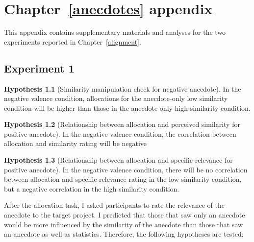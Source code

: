 \documentclass[a4paper, nobind, dvipsnames]{templates/ociamthesis}
\theoremstyle{definition}
\theoremstyle{definition}
\theoremstyle{definition}
\theoremstyle{definition}
\newtheorem{hypothesis}{Hypothesis}[chapter]
\theoremstyle{remark}
\begin{document}
\hypertarget{anecdotes-appendix}{%
\chapter{Chapter~\ref{anecdotes} appendix}\label{anecdotes-appendix}}

\minitoc

This appendix contains supplementary materials and analyses for the two
experiments reported in Chapter~\ref{alignment}.

\hypertarget{anecdotes-1-appendix}{%
\section{Experiment 1}\label{anecdotes-1-appendix}}

\begin{hypothesis}[Similarity manipulation check for negative anecdote]
\protect\hypertarget{hyp:similarity-check-anecdotes-1}{}{\label{hyp:similarity-check-anecdotes-1} {} }In the negative valence condition, allocations for the anecdote-only low
similarity condition will be higher than those in the anecdote-only high
similarity condition.
\end{hypothesis}

\begin{hypothesis}[Relationship between allocation and perceived similarity for positive anecdote]
\protect\hypertarget{hyp:allocation-similarity-anecdotes-1}{}{\label{hyp:allocation-similarity-anecdotes-1} {} }In the negative valence condition, the correlation between allocation and
similarity rating will be negative
\end{hypothesis}

\begin{hypothesis}[Relationship between allocation and specific-relevance for positive anecdote]
\protect\hypertarget{hyp:allocation-specific-relevance-anecdotes-1}{}{\label{hyp:allocation-specific-relevance-anecdotes-1} {} }In the negative valence condition, there will be no correlation between
allocation and specific-relevance rating in the low similarity condition, but a
negative correlation in the high similarity condition.
\end{hypothesis}

After the allocation task, I asked participants to rate the relevance of the
anecdote to the target project. I predicted that those that saw only an
anecdote would be more influenced by the similarity of the anecdote than those
that saw an anecdote as well as statistics. Therefore, the following hypotheses
are tested:
\end{document}
